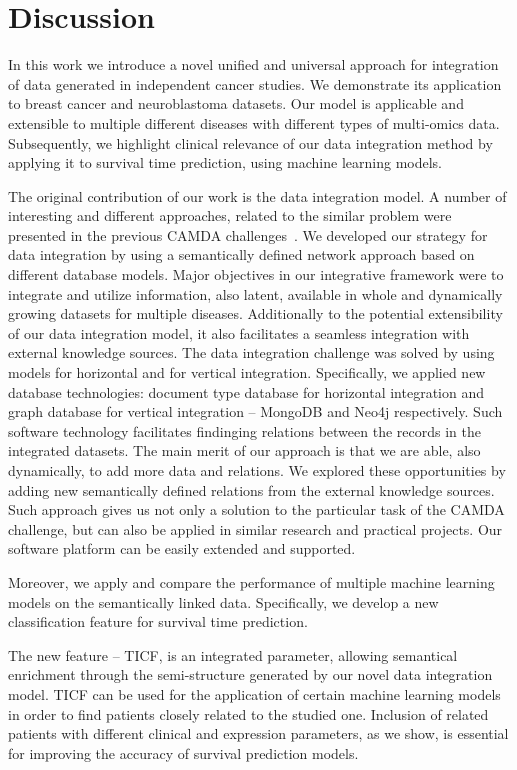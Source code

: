 \documentclass{bmcart}
\begin{document}
\section{Discussion}

In this work we introduce a novel unified and universal approach for
integration of data generated in independent cancer studies. We
demonstrate its application to breast cancer and neuroblastoma
datasets. Our model is applicable and extensible to multiple different
diseases with different types of multi-omics data. Subsequently, we
highlight clinical relevance of our data integration method by applying
it to survival time prediction, using machine learning models.

The original contribution of our work is the data integration model. A
number of  interesting and different approaches, related to the similar
problem were presented in the previous CAMDA challenges~\cite{35}. We
developed our strategy for data integration by using a semantically
defined network approach based on different database models. Major
objectives in our integrative framework were to integrate and utilize
information, also latent, available in whole and dynamically growing
datasets for multiple diseases. Additionally to the potential
extensibility of our data integration model, it also facilitates a
seamless integration with external knowledge sources. The data
integration challenge was solved by using models for horizontal and for
vertical integration. Specifically, we applied new database
technologies: document type database for horizontal integration and
graph database for vertical integration -- MongoDB and Neo4j
respectively. Such software technology facilitates findinging relations
between the records in the integrated datasets. The main merit of our
approach is that we are able, also dynamically, to add more data and
relations. We explored these opportunities by adding new semantically
defined relations from the external knowledge sources. Such approach
gives us not only a solution to the particular task of the CAMDA
challenge, but can also be applied in similar research and practical
projects. Our software platform can be easily extended and supported.

Moreover, we apply and compare the performance of multiple machine
learning models on the semantically linked data. Specifically, we
develop a new classification feature for survival time prediction. 

The new feature -- TICF, is an integrated parameter, allowing semantical
enrichment through the semi-structure generated by our novel data
integration model. TICF can be used for the application of certain
machine learning models in order to find patients closely related to
the studied one. Inclusion of related patients with different clinical
and expression parameters, as we show, is essential for improving the
accuracy of survival prediction models.
\end{document}
